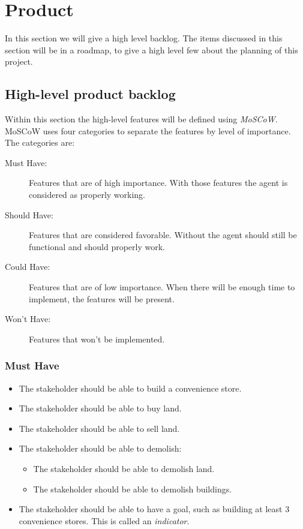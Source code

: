 \label{product}
\section{Product}
In this section we will give a high level backlog. The items discussed in this section will be in a roadmap, to give a high level few about the planning of this project.
\subsection{High-level product backlog}

Within this section the high-level features will be defined using \textit{MoSCoW}. MoSCoW uses four categories to separate the features by level of importance. The categories are:

\begin{description}
	\item[Must Have:] Features that are of high importance. With those features the agent is considered as properly working.
	\item[Should Have:] Features that are considered favorable. Without the agent should still be functional and should properly work.
	\item[Could Have:] Features that are of low importance. When there will be enough time to implement, the features will be present.
	\item[Won't Have:] Features that won't be implemented.
\end{description}

\subsubsection{Must Have}
\begin{itemize}
	\item The stakeholder should be able to build a convenience store.
	\item The stakeholder should be able to buy land.
	\item The stakeholder should be able to sell land.
	\item The stakeholder should be able to demolish:
		\begin{itemize}
			\item The stakeholder should be able to demolish land.
			\item The stakeholder should be able to demolish buildings.
		\end{itemize}
	\item The stakeholder should be able to have a goal, such as building at least 3 convenience stores. This is called an \textit{indicator}.
\end{itemize}

